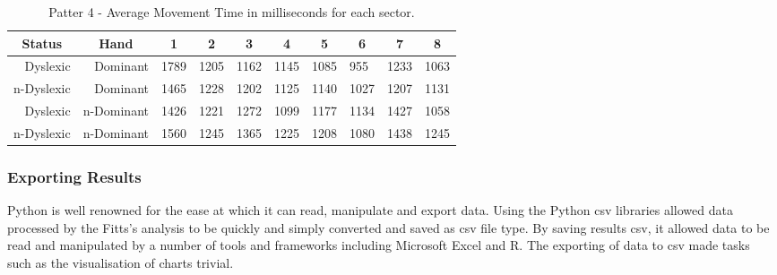 			\begin{table}[]
				\centering
				\caption{Patter 4 - Average Movement Time in milliseconds for each sector.}
				\label{tab_pat_4_mt}
				\begin{tabularx}{\textwidth}{|r|r|X|X|X|X|X|X|X|X|}
					\hline
					\multicolumn{1}{|c|}{\textbf{Status}} & \multicolumn{1}{c|}{\textbf{Hand}} & \multicolumn{1}{c|}{\textbf{1}} & \multicolumn{1}{c|}{\textbf{2}} & \multicolumn{1}{c|}{\textbf{3}} & \multicolumn{1}{c|}{\textbf{4}} & \multicolumn{1}{c|}{\textbf{5}} & \multicolumn{1}{c|}{\textbf{6}} & \multicolumn{1}{c|}{\textbf{7}} & \multicolumn{1}{c|}{\textbf{8}} \\ \hline
					Dyslexic                              & Dominant                           & 1789       & 1205       & 1162       & 1145       & 1085       & 955        & 1233       & 1063       \\ \hline
					n-Dyslexic                          & Dominant                           & 1465       & 1228       & 1202       & 1125       & 1140       & 1027       & 1207       & 1131       \\ \hline
					Dyslexic                              & n-Dominant                       & 1426       & 1221       & 1272       & 1099       & 1177       & 1134       & 1427       & 1058       \\ \hline
					n-Dyslexic                          & n-Dominant                       & 1560       & 1245       & 1365       & 1225       & 1208       & 1080       & 1438       & 1245       \\ \hline
				\end{tabularx}
			\end{table}
		
		\subsubsection{Exporting Results}
			Python is well renowned for the ease at which it can read, manipulate and export data. Using the Python csv libraries allowed data processed by the Fitts’s analysis to be quickly and simply converted and saved as csv file type. By saving results csv, it allowed data to be read and manipulated by a number of tools and frameworks including Microsoft Excel and R. The exporting of data to csv made tasks such as the visualisation of charts trivial.
	
\newpage